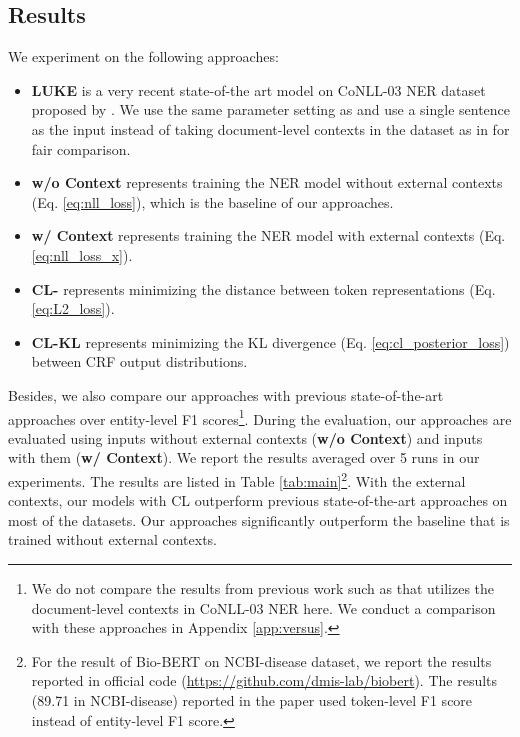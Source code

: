 \documentclass[11pt,a4paper]{article}
\begin{document}
\subsection{Results}
We experiment on the following approaches:
\begin{itemize}[leftmargin=*]
\item {\sc\textbf{LUKE}} is a very recent state-of-the art model on CoNLL-03 NER dataset proposed by \citet{yamada-etal-2020-luke}. We use the same parameter setting as \citet{yamada-etal-2020-luke} and use a single sentence as the input instead of taking document-level contexts in the dataset as in \citet{yamada-etal-2020-luke} for fair comparison.
    \item {\sc\textbf{w/o Context}} represents training the NER model without external contexts (Eq. \ref{eq:nll_loss}), which is the baseline of our approaches. 
    \item {\sc\textbf{w/ Context}} represents training the NER model with external contexts (Eq. \ref{eq:nll_loss_x}). 
    \item {\sc\textbf{CL-}} represents minimizing the  distance between token representations (Eq. \ref{eq:L2_loss}).
    \item {\sc\textbf{CL-KL}} represents minimizing the KL divergence (Eq. \ref{eq:cl_posterior_loss}) between CRF output distributions.
\end{itemize}
Besides, we also compare our approaches with previous state-of-the-art approaches over entity-level F1 scores\footnote{We do not compare the results from previous work such as \citet{yu-etal-2020-named,luoma-pyysalo-2020-exploring,yamada-etal-2020-luke} that utilizes the document-level contexts in CoNLL-03 NER here. We conduct a comparison with these approaches in Appendix \ref{app:versus}. }.
During the evaluation, our approaches are evaluated using inputs without external contexts ({\sc\textbf{w/o Context}}) and inputs with them ({\sc\textbf{w/ Context}}). We report the results averaged over 5 runs in our experiments. The results are listed in Table \ref{tab:main}\footnote{For the result of Bio-BERT \citep{lee2020biobert} on NCBI-disease dataset, we report the results reported in official code (\url{https://github.com/dmis-lab/biobert}). The results (89.71 in NCBI-disease) reported in the paper used token-level F1 score instead of entity-level F1 score.}. With the external contexts, our models with CL outperform previous state-of-the-art approaches on most of the datasets. Our approaches significantly outperform the baseline that is trained without external contexts. 
\end{document}
